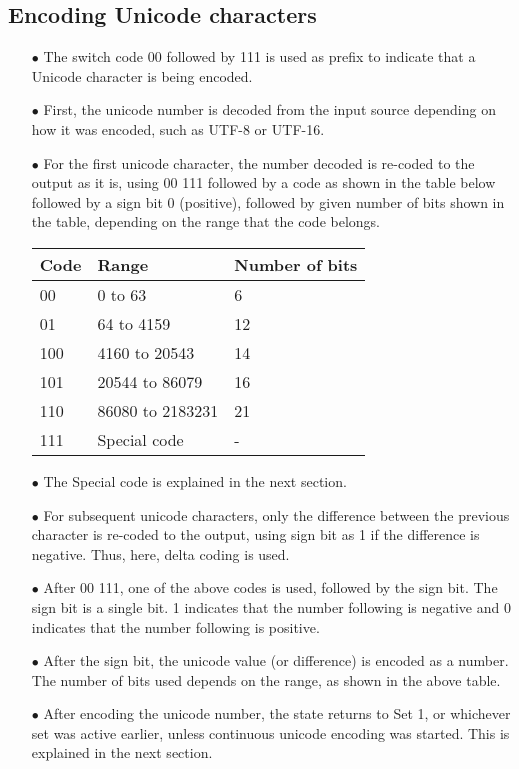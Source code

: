 \documentclass[]{article}
\begin{document}
\subsection{Encoding Unicode characters}
\begin{itemize}
	\item[$\bullet$] The switch code 00 followed by 111 is used as prefix to indicate that a Unicode character is being encoded.
	\item[$\bullet$] First, the unicode number is decoded from the input source depending on how it was encoded, such as UTF-8 or UTF-16.
	\item[$\bullet$] For the first unicode character, the number decoded is re-coded to the output as it is, using 00 111 followed by a code as shown in the table below followed by a sign bit 0 (positive), followed by given number of bits shown in the table, depending on the range that the code belongs.
	\item[] \begin{tabular}{ | l | l | l |} \hline
		\textbf{Code} & \textbf{Range} & \textbf{Number of bits} \\ \hline
		00 & 0 to 63 & 6 \\ \hline
		01 & 64 to 4159 & 12 \\ \hline
		100 & 4160 to 20543 & 14 \\ \hline
		101 & 20544 to 86079 & 16 \\ \hline
		110 & 86080 to 2183231 & 21 \\ \hline
		111 & Special code & - \\ \hline
		\end{tabular}
	\item[$\bullet$] The Special code is explained in the next section.
	\item[$\bullet$] For subsequent unicode characters, only the difference between the previous character is re-coded to the output, using sign bit as 1 if the difference is negative. Thus, here, delta coding is used.
	\item[$\bullet$] After 00 111, one of the above codes is used, followed by the sign bit. The sign bit is a single bit. 1 indicates that the number following is negative and 0 indicates that the number following is positive.
	\item[$\bullet$] After the sign bit, the unicode value (or difference) is encoded as a number. The number of bits used depends on the range, as shown in the above table.
	\item[$\bullet$] After encoding the unicode number, the state returns to Set 1, or whichever set was active earlier, unless continuous unicode encoding was started. This is explained in the next section.
\end{itemize}
\end{document}
